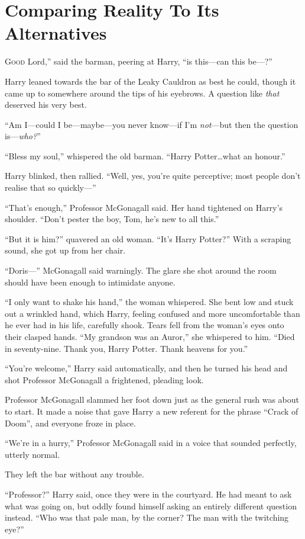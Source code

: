 \chapter{Comparing Reality To Its Alternatives}

\lettrine[ante=“]{G}{ood} Lord,” said the barman, peering at Harry, “is this—can this be—?”

Harry leaned towards the bar of the Leaky Cauldron as best he could, though it came up to somewhere around the tips of his eyebrows. A question like \emph{that} deserved his very best.

“Am I—could I be—maybe—you never know—if I’m \emph{not}—but then the question is—\emph{who?}”

“Bless my soul,” whispered the old barman. “Harry Potter…what an honour.”

Harry blinked, then rallied. “Well, yes, you’re quite perceptive; most people don’t realise that so quickly—”

“That’s enough,” Professor McGonagall said. Her hand tightened on Harry’s shoulder. “Don’t pester the boy, Tom, he’s new to all this.”

“But it is him?” quavered an old woman. “It’s Harry Potter?” With a scraping sound, she got up from her chair.

“Doris—” McGonagall said warningly. The glare she shot around the room should have been enough to intimidate anyone.

“I only want to shake his hand,” the woman whispered. She bent low and stuck out a wrinkled hand, which Harry, feeling confused and more uncomfortable than he ever had in his life, carefully shook. Tears fell from the woman’s eyes onto their clasped hands. “My grandson was an Auror,” she whispered to him. “Died in seventy-nine. Thank you, Harry Potter. Thank heavens for you.”

“You’re welcome,” Harry said automatically, and then he turned his head and shot Professor McGonagall a frightened, pleading look.

Professor McGonagall slammed her foot down just as the general rush was about to start. It made a noise that gave Harry a new referent for the phrase “Crack of Doom”, and everyone froze in place.

“We’re in a hurry,” Professor McGonagall said in a voice that sounded perfectly, utterly normal.

They left the bar without any trouble.

“Professor?” Harry said, once they were in the courtyard. He had meant to ask what was going on, but oddly found himself asking an entirely different question instead. “Who was that pale man, by the corner? The man with the twitching eye?”


